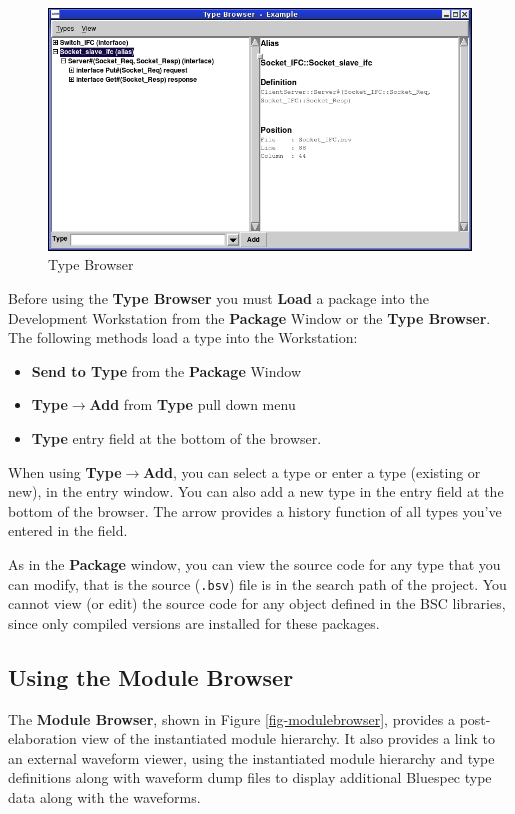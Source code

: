 \documentclass{article}
\newcommand{\te}[1]{\texttt{#1}}
\begin{document}
\begin{figure}[ht]
\begin{center}
\includegraphics[width = 4 in]{figures/typebrowser}
\caption{Type Browser}
\label{fig-type}
\end{center}
\end{figure}


Before using the {\bf Type Browser} you must  {\bf Load} a
package  into the Development Workstation from the {\bf Package}
Window or the {\bf Type Browser}.  The following methods load a type into the Workstation:
\begin{itemize}
\item {\bf Send to Type} from the {\bf Package} Window
\item {\bf Type$\rightarrow$Add} from {\bf Type} pull down menu
\item {\bf Type} entry field at the bottom of the browser.
\end{itemize}

When using {\bf Type$\rightarrow$Add}, you can select a type or enter
a type (existing or new), in the entry window.  You can also add a new
type in the entry field at the bottom of the browser.  The arrow
provides a history function of all types you've entered in the field.

As in the {\bf Package} window, you can view the source code for any
type that you can modify, that is  the source (\te{.bsv}) file is
in the  search path of the project.
You cannot view (or edit) the source
code for any object defined in the BSC
libraries, since only compiled versions are
installed for these packages.


\subsection{Using the Module Browser}

The {\bf Module Browser}, shown in Figure \ref{fig-modulebrowser},
provides a post-elaboration  view of
the instantiated module hierarchy.  It  also provides a
 link to an external  waveform viewer, using
 the instantiated module hierarchy and  type definitions
along with waveform dump files to display additional Bluespec type data along
 with the waveforms.
\end{document}
